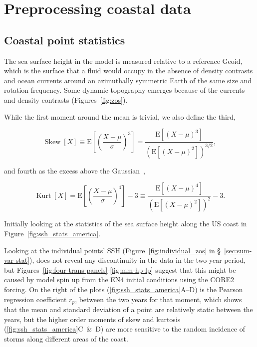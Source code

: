 \section{Preprocessing coastal data}
\subsection{Coastal point statistics}
The sea surface height in the model is measured relative to
a reference Geoid, which is the surface that a fluid would occupy
in the absence of density contrasts and ocean currents around an
azimuthally symmetric Earth of the same size and rotation frequency.
Some dynamic topography emerges because of the
currents and density contrasts (Figures~\ref{fig:zos}).




While the first moment around the mean is trivial, we also define the third,

\begin{equation}
\operatorname{Skew}[X]\equiv \mathrm{E}\left[\left(\frac{X-\mu}{\sigma}\right)^{3}\right]
=\frac{\mathrm{E}\left[(X-\mu)^{3}\right]}{\left(\mathrm{E}\left[(X-\mu)^{2}\right]\right)^{3 / 2}},
\end{equation}

and fourth as the excess above the Gaussian~\cite{taleb2019statistical},

\begin{equation}
\operatorname{Kurt}[X]=
\mathrm{E}\left[\left(\frac{X-\mu}{\sigma}\right)^{4}\right]-3
\equiv \frac{\mathrm{E}\left[(X-\mu)^{4}\right]}{\left(\mathrm{E}\left[(X-\mu)^{2}\right]\right)^{2}}-3.
\end{equation}


Initially looking at the statistics of the sea surface height along the
US coast in Figure~\ref{fig:ssh_stats_america}.




Looking at the individual points' SSH (Figure~\ref{fig:individual_zos} in §~\ref{sec:sum-var-stat}),
does not reveal any discontinuity in the data in the two year period,
 but Figures~\ref{fig:four-trans-panels}-\ref{fig:mm-hp-lp}
suggest that this might be caused by model spin up from the
EN4 initial conditions using the CORE2 forcing.
On the right of the plots (\ref{fig:ssh_stats_america}A--D)
is the Pearson regression coefficient $r_p$,
between the two years for that moment, which shows that the mean and
standard deviation of a point are relatively static between the years, but the
higher order moments of skew and kurtosis
(\ref{fig:ssh_stats_america}C~\&~D) are more sensitive to the
random incidence of storms along different areas of the coast.




